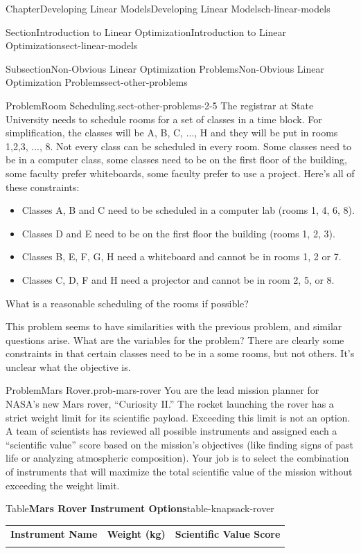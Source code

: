 \documentclass[oneside,10pt,]{book}
\newcommand{\tabularfont}{\relax}
\numberwithin{equation}{section}
\newcommand{\hrulemedium}{\noalign{\hrule height 0.07em}}
\begin{document}
\begin{chapterptx}{Chapter}{Developing Linear Models}{}{Developing Linear Models}{}{}{ch-linear-models}
\begin{sectionptx}{Section}{Introduction to Linear Optimization}{}{Introduction to Linear Optimization}{}{}{sect-linear-models}
\begin{subsectionptx}{Subsection}{Non-Obvious Linear Optimization Problems}{}{Non-Obvious Linear Optimization Problems}{}{}{sect-other-problems}
\begin{introduction}{}
\begin{problem}{Problem}{Room Scheduling.}{sect-other-problems-2-5}
The registrar at State University needs to schedule rooms for a set of classes in a time block. For simplification, the classes will be A, B, C, ..., H and they will be put in rooms 1,2,3, ..., 8. Not every class can be scheduled in every room. Some classes need to be in a computer class, some classes need to be on the first floor of the building, some faculty prefer whiteboards, some faculty prefer to use a project. Here's all of these constraints:%
\par
%
\begin{itemize}[label=\textbullet]
\item{}Classes A, B and C need to be scheduled in a computer lab (rooms 1, 4, 6, 8).%
\item{}Classes D and E need to be on the first floor the building (rooms 1, 2, 3).%
\item{}Classes B, E, F, G, H need a whiteboard and cannot be in rooms 1, 2 or 7.%
\item{}Classes C, D, F and H need a projector and cannot be in room 2, 5, or 8.%
\end{itemize}
%
\par
What is a reasonable scheduling of the rooms if possible?%
\end{problem}
This problem seems to have similarities with the previous problem, and similar questions arise. What are the variables for the problem?  There are clearly some constraints in that certain classes need to be in a some rooms, but not others. It's unclear what the objective is.%
\begin{problem}{Problem}{Mars Rover.}{prob-mars-rover}%
You are the lead mission planner for NASA's new Mars rover, ``Curiosity II.'' The rocket launching the rover has a strict weight limit for its scientific payload. Exceeding this limit is not an option. A team of scientists has reviewed all possible instruments and assigned each a ``scientific value'' score based on the mission's objectives (like finding signs of past life or analyzing atmospheric composition). Your job is to select the combination of instruments that will maximize the total scientific value of the mission without exceeding the weight limit. \footnotemark{}%
\begin{tableptx}{Table}{\textbf{Mars Rover Instrument Options}}{table-knapsack-rover}{}%
\centering%
{\tabularfont%
\begin{tabular}{lll}
{\bfseries{}Instrument Name}&\multicolumn{1}{c}{{\bfseries{}Weight (kg)}}&\multicolumn{1}{c}{{\bfseries{}Scientific Value Score}}\tabularnewline\hrulemedium

\end{tabular}}
\end{tableptx}
\end{problem}
\end{introduction}
\end{subsectionptx}
\end{sectionptx}
\end{chapterptx}
\end{document}
